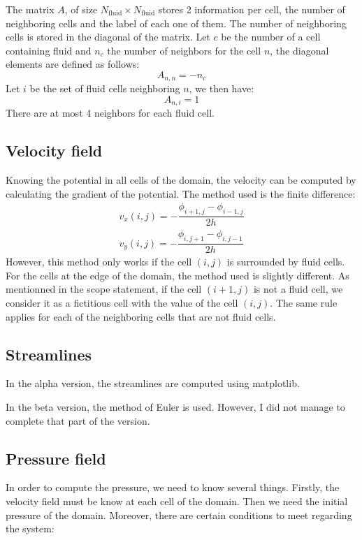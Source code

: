 The matrix $A$, of size $N_\text{fluid} \times N_\text{fluid}$ stores 2
information per cell, the number of neighboring cells and the label of each
one of them. The number of neighboring cells is stored in the diagonal of the
 matrix. Let $c$ be the number of a cell containing fluid and $n_c$ the number
 of neighbors for the cell $n$, the diagonal elements are defined as follows:
\[
      A_{n, n} = -n_c
\]
Let $i$ be the set of fluid cells neighboring $n$, we then have:
\[
      A_{n, i} = 1
\]
There are at most 4 neighbors for each fluid cell.

\subsection{Velocity field}
Knowing the potential in all cells of the domain, the velocity can be computed
by calculating the gradient of the potential.
The method used is the finite difference:
\[
      \begin{array}{c}
            v_x(i, j) = - \dfrac{\phi_{i+1, j} - \phi_{i-1, j}}{2h}\\
            v_y(i, j) = - \dfrac{\phi_{i, j+1} - \phi_{i, j-1}}{2h}
      \end{array}
\]
However, this method only works if the cell $(i, j)$ is surrounded by fluid
cells. For the cells at the edge of the domain, the method used is slightly
different. As mentionned in the scope statement\cite{scope-statement}, if the
cell $(i+1, j)$ is not a fluid cell, we consider it as a fictitious cell with
the value of the cell $(i, j)$. The same rule applies for each of the
neighboring cells that are not fluid cells.

\subsection{Streamlines}
In the alpha version, the streamlines are computed using matplotlib.

In the beta version, the method of Euler is used. However, I did not manage to
complete that part of the version.

\subsection{Pressure field}
In order to compute the pressure, we need to know several things. Firstly, the
velocity field must be know at each cell of the domain. Then we need the
initial pressure of the domain. Moreover, there are certain conditions to meet
regarding the system:

